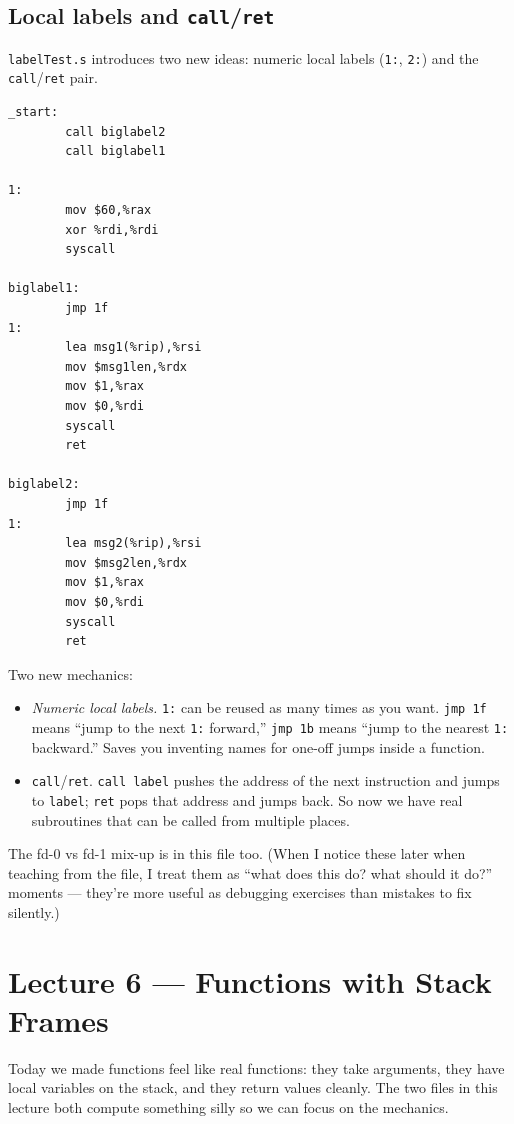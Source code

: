 \documentclass[11pt]{article}
\begin{document}
\subsection*{Local labels and \texttt{call}/\texttt{ret}}

\texttt{labelTest.s} introduces two new ideas: numeric local labels
(\texttt{1:}, \texttt{2:}) and the \texttt{call}/\texttt{ret} pair.

\begin{lstlisting}
_start:
        call biglabel2
        call biglabel1

1:
        mov $60,%rax
        xor %rdi,%rdi
        syscall

biglabel1:
        jmp 1f
1:
        lea msg1(%rip),%rsi
        mov $msg1len,%rdx
        mov $1,%rax
        mov $0,%rdi
        syscall
        ret

biglabel2:
        jmp 1f
1:
        lea msg2(%rip),%rsi
        mov $msg2len,%rdx
        mov $1,%rax
        mov $0,%rdi
        syscall
        ret
\end{lstlisting}

Two new mechanics:

\begin{itemize}
  \item \emph{Numeric local labels.} \texttt{1:} can be reused as
    many times as you want. \texttt{jmp 1f} means ``jump to the next
    \texttt{1:} forward,'' \texttt{jmp 1b} means ``jump to the
    nearest \texttt{1:} backward.'' Saves you inventing names for
    one-off jumps inside a function.
  \item \texttt{call}/\texttt{ret}. \texttt{call label} pushes the
    address of the next instruction and jumps to \texttt{label};
    \texttt{ret} pops that address and jumps back. So now we have
    real subroutines that can be called from multiple places.
\end{itemize}

The fd-0 vs fd-1 mix-up is in this file too. (When I notice these
later when teaching from the file, I treat them as ``what does this
do? what should it do?'' moments --- they're more useful as
debugging exercises than mistakes to fix silently.)

\section{Lecture 6 --- Functions with Stack Frames}

Today we made functions feel like real functions: they take
arguments, they have local variables on the stack, and they return
values cleanly. The two files in this lecture both compute something
silly so we can focus on the mechanics.
\end{document}
